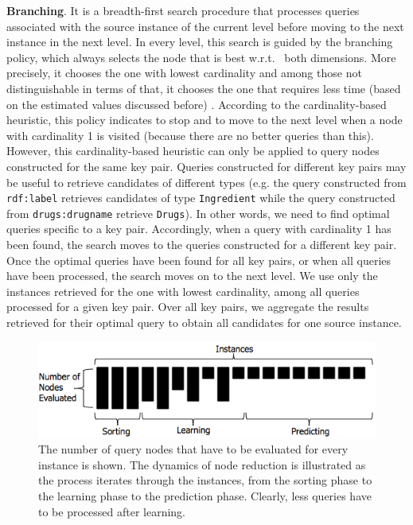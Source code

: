 \textbf{Branching}. It is a breadth-first search procedure that processes queries associated with the source instance of the current level before moving to the next instance in the next level. In every level, this search is guided by the branching policy, which always selects the node that is best w.r.t.~ both dimensions. More precisely, it chooses the one with lowest cardinality and among those not distinguishable in terms of that, it chooses the one that requires less time (based on the estimated values discussed before) . According to the cardinality-based heuristic, this policy indicates to stop and to move to the next level when a node with cardinality 1 is visited (because there are no better queries than this). However, this cardinality-based heuristic can only be applied to query nodes constructed for the same key pair. Queries constructed for different key pairs may be useful to retrieve candidates of different types (e.g. the query constructed from \verb+rdf:label+ retrieves candidates of type \verb+Ingredient+ while the query constructed from \verb+drugs:drugname+ retrieve \verb+Drugs+). In other words, we need to find optimal queries specific to a key pair. Accordingly, when a query with cardinality 1 has been found, the search moves to the queries constructed for a different key pair. 
Once the optimal queries have been found for all key pairs, or when all queries have been processed, the search moves on to the next level. We use only the instances retrieved for the one with lowest cardinality, among all queries processed for a given key pair. Over all key pairs, we aggregate the results retrieved for their optimal query to obtain all candidates for one source instance. 

\begin{figure} 
\vspace{-10pt}
\centering
\includegraphics[scale=0.45]{p23.png}
\caption{The number of query nodes that have to be evaluated for every instance is shown. The dynamics of node reduction is illustrated as the process iterates through the instances, from the sorting phase to the learning phase to the prediction phase. Clearly, less queries have to be processed after learning.} 
\label{fig:3phases}
\vspace{-10pt}
\end{figure} 

